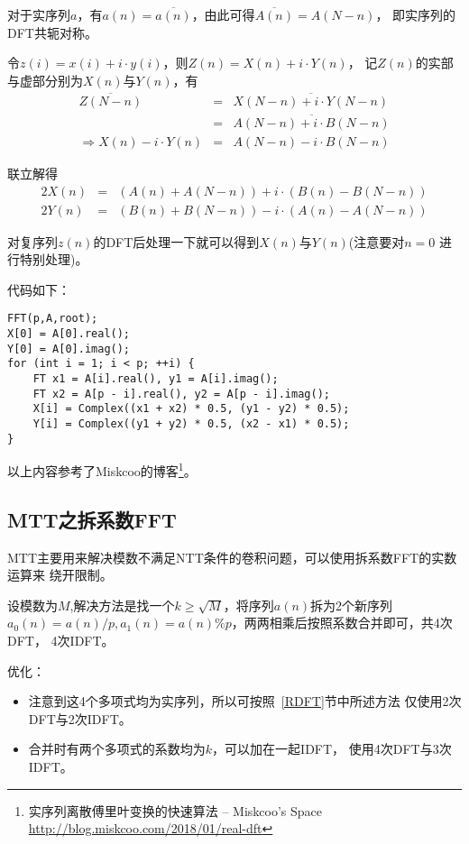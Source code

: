 对于实序列$a$，有$a(n)=\overline{a(n)}$，由此可得$\overline{A(n)}=A(N-n)$，
即实序列的DFT共轭对称。

令$z(i)=x(i)+i\cdot y(i)$，则$Z(n)=X(n)+i\cdot Y(n)$，
记$Z(n)$的实部与虚部分别为$X(n)$与$Y(n)$，有
\begin{eqnarray*}
	\overline{Z(N-n)}&=&\overline{X(N-n)+i\cdot Y(N-n)}\\
	&=&\overline{A(N-n)+i\cdot B(N-n)}\\
	\Rightarrow X(n)-i\cdot Y(n)&=&A(N-n)-i\cdot B(N-n)
\end{eqnarray*}

联立解得
\begin{eqnarray*}
	2X(n)&=&(A(n)+A(N-n))+i\cdot (B(n)-B(N-n))\\
	2Y(n)&=&(B(n)+B(N-n))-i\cdot (A(n)-A(N-n))
\end{eqnarray*}

对复序列$z(n)$的DFT后处理一下就可以得到$X(n)$与$Y(n)$(注意要对$n=0$
进行特别处理)。

代码如下：
\begin{lstlisting}
FFT(p,A,root);
X[0] = A[0].real();
Y[0] = A[0].imag();
for (int i = 1; i < p; ++i) {
	FT x1 = A[i].real(), y1 = A[i].imag();
	FT x2 = A[p - i].real(), y2 = A[p - i].imag();
	X[i] = Complex((x1 + x2) * 0.5, (y1 - y2) * 0.5);
	Y[i] = Complex((y1 + y2) * 0.5, (x2 - x1) * 0.5);
}
\end{lstlisting}

以上内容参考了Miskcoo的博客\footnote{实序列离散傅里叶变换的快速算法 – Miskcoo's Space
\url{http://blog.miskcoo.com/2018/01/real-dft}}。
\subsection{MTT之拆系数FFT}
MTT主要用来解决模数不满足NTT条件的卷积问题，可以使用拆系数FFT的实数运算来
绕开限制。

设模数为$M$,解决方法是找一个$k\geq\sqrt{M}$，将序列$a(n)$拆为2个新序列
$a_0(n)=a(n)/p,a_1(n)=a(n)\% p$，两两相乘后按照系数合并即可，共4次DFT，
4次IDFT。

优化：
\begin{itemize}
	\item 注意到这4个多项式均为实序列，所以可按照~\ref{RDFT}节中所述方法
	仅使用2次DFT与2次IDFT。
	\item 合并时有两个多项式的系数均为$k$，可以加在一起IDFT，
	使用4次DFT与3次IDFT。
\end{itemize}
